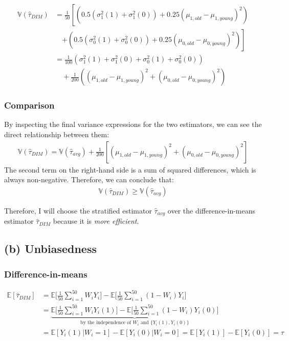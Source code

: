 \documentclass[11pt]{article}
\numberwithin{equation}{section}
\newcommand{\E}{\mathbb{E}}
\newcommand{\Var}{\mathbb{V}}
\begin{document}
\begin{align*}
\Var(\hat{\tau}_{DIM}) &= \frac{1}{50} \left[ \left(0.5(\sigma^2_1(1) + \sigma^2_1(0)) + 0.25(\mu_{1,old}-\mu_{1,young})^2\right) \right. \\
&\quad \left. + \left(0.5(\sigma^2_0(1) + \sigma^2_0(0)) + 0.25(\mu_{0,old}-\mu_{0,young})^2\right) \right] \\
&= \frac{1}{100} (\sigma^2_1(1) + \sigma^2_1(0) + \sigma^2_0(1) + \sigma^2_0(0)) \\
&\quad + \frac{1}{200} \left( (\mu_{1,old}-\mu_{1,young})^2 + (\mu_{0,old}-\mu_{0,young})^2 \right)
\end{align*}

\subsubsection{Comparison}

By inspecting the final variance expressions for the two estimators, we can see the direct relationship between them:
\begin{align}
\Var(\hat{\tau}_{DIM}) = \Var(\hat{\tau}_{avg}) + \frac{1}{200} \left[ (\mu_{1,old}-\mu_{1,young})^2 + (\mu_{0,old}-\mu_{0,young})^2 \right]
\end{align}
The second term on the right-hand side is a sum of squared differences, which is always non-negative. Therefore, we can conclude that:
\begin{align}
\Var(\hat{\tau}_{DIM}) \ge \Var(\hat{\tau}_{avg})
\end{align}

Therefore, I will choose the stratified estimator $\hat{\tau}_{avg}$ over the difference-in-means estimator $\hat{\tau}_{DIM}$ because it is \textit{more efficient}.

\subsection{(b) Unbiasedness}



\subsubsection{Difference-in-means}

\begin{align}
    \E[\hat{\tau}_{DIM}] &= \E\biggl[\frac{1}{50}\sum_{i=1}^{50}W_iY_i\biggr] - \E\biggl[\frac{1}{50}\sum_{i=1}^{50}(1-W_i)Y_i\biggr]\\
    &=\underbrace{ \E\biggl[\frac{1}{50}\sum_{i=1}^{50}W_iY_i(1)\biggr] - \E\biggl[\frac{1}{50}\sum_{i=1}^{50}(1-W_i)Y_i(0)\biggr]}_\text{by the independence of $W_i$ and $\{Y_i(1), Y_i(0)\}$}\\
    &= \E[Y_i(1) | W_i=1] - \E[Y_i(0) | W_i=0] = \E[Y_i(1)] - \E[Y_i(0)] = \tau
\end{align}
\end{document}
